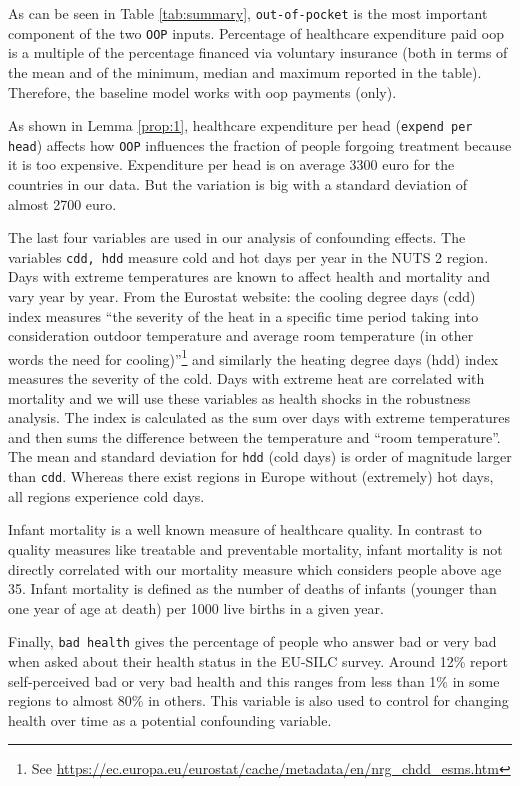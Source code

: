 \documentclass[a4paper,12pt]{article}
\begin{document}
As can be seen in Table \ref{tab:summary}, \texttt{out-of-pocket} is the most important component of the two \texttt{OOP} inputs. Percentage of healthcare expenditure paid oop is a multiple of the percentage financed via voluntary insurance (both in terms of the mean and of the minimum, median and maximum reported in the table). Therefore, the baseline model works with oop payments (only).

As shown in Lemma \ref{prop:1}, healthcare expenditure per head (\texttt{expend per head}) affects how \texttt{OOP} influences the fraction of people forgoing treatment because it is too expensive. Expenditure per head is on average 3300 euro for the countries in our data. But the variation is big with a standard deviation of almost 2700 euro.

The last four variables are used in our analysis of confounding effects. The variables \texttt{cdd, hdd} measure cold and hot days per year in the NUTS 2 region. Days with extreme temperatures are known to affect health and mortality and vary year by year. From the Eurostat website: the cooling degree days (cdd) index measures ``the severity of the heat in a specific time period taking into consideration outdoor temperature and average room temperature (in other words the need for cooling)''\footnote{See \href{https://ec.europa.eu/eurostat/cache/metadata/en/nrg\_chdd\_esms.htm}{https://ec.europa.eu/eurostat/cache/metadata/en/nrg\_chdd\_esms.htm}} and similarly the heating degree days (hdd) index measures the severity of the cold. Days with extreme heat are correlated with mortality and we will use these variables as health shocks in the robustness analysis. The index is calculated as the sum over days with extreme temperatures and then sums the difference between the temperature and ``room temperature''. The mean and standard deviation for \texttt{hdd} (cold days) is order of magnitude larger than \texttt{cdd}. Whereas there exist regions in Europe without (extremely) hot days, all regions experience cold days.

Infant mortality is a well known measure of healthcare quality. In contrast to quality measures like treatable and preventable mortality, infant mortality is not directly correlated with our mortality measure which considers people above age 35. Infant mortality is defined as the number of deaths of infants (younger than one year of age at death) per 1000 live births in a given year.

Finally, \texttt{bad health} gives the percentage of people who answer bad or very bad when asked about their health status in the EU-SILC survey. Around 12\% report self-perceived bad or very bad health and this ranges from less than 1\% in some regions to almost 80\% in others. This variable is also used to control for changing health over time as a potential confounding variable.
\end{document}
